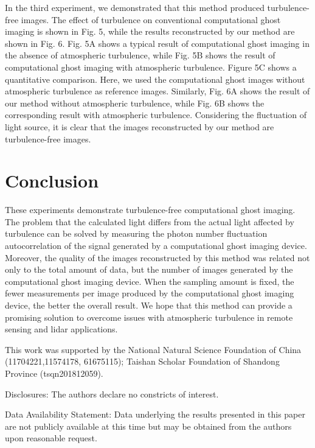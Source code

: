 \documentclass[letterpaper,10pt]{article}
\begin{document}
In the third experiment, we demonstrated that this method produced
turbulence-free images. The effect of turbulence on conventional
computational ghost imaging is shown in Fig. 5, while the results
reconstructed by our method are shown in Fig. 6. Fig. 5A shows a typical
result of computational ghost imaging in the absence of atmospheric
turbulence, while Fig. 5B shows the result of computational ghost imaging
with atmospheric turbulence. Figure 5C shows a quantitative comparison.
Here, we used the computational ghost images without atmospheric turbulence
as reference images. Similarly, Fig. 6A shows the result of our method
without atmospheric turbulence, while Fig. 6B shows the corresponding result
with atmospheric turbulence. Considering the fluctuation of light source, it
is clear that the images reconstructed by our method are turbulence-free
images.

\section{Conclusion}

These experiments demonstrate turbulence-free computational ghost imaging.
The problem that the calculated light differs from the actual light affected
by turbulence can be solved by measuring the photon number fluctuation
autocorrelation of the signal generated by a computational ghost imaging
device. Moreover, the quality of the images reconstructed by this method was
related not only to the total amount of data, but the number of images
generated by the computational ghost imaging device. When the sampling
amount is fixed, the fewer measurements per image produced by the
computational ghost imaging device, the better the overall result. We hope
that this method can provide a promising solution to overcome issues with
atmospheric turbulence in remote sensing and lidar applications.

This work was supported by the National Natural Science Foundation of China (11704221,11574178, 61675115); Taishan Scholar Foundation of Shandong Province (tsqn201812059).

Disclosures: The authors declare no constricts of interest.

Data Availability Statement:
Data underlying the results presented in this paper are not publicly available at this time but may
be obtained from the authors upon reasonable request.
\end{document}
